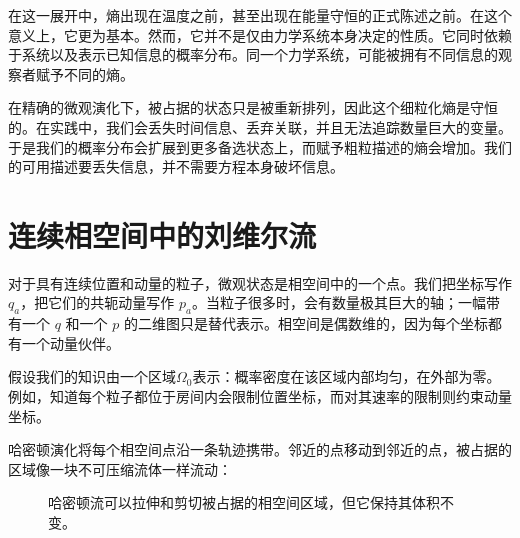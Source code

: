 在这一展开中，熵出现在温度之前，甚至出现在能量守恒的正式陈述之前。在这个意义上，它更为基本。然而，它并不是仅由力学系统本身决定的性质。它同时依赖于系统以及表示已知信息的概率分布。同一个力学系统，可能被拥有不同信息的观察者赋予不同的熵。

在精确的微观演化下，被占据的状态只是被重新排列，因此这个细粒化熵是守恒的。在实践中，我们会丢失时间信息、丢弃关联，并且无法追踪数量巨大的变量。于是我们的概率分布会扩展到更多备选状态上，而赋予粗粒描述的熵会增加。我们的可用描述要丢失信息，并不需要方程本身破坏信息。

\begin{classroomqa}
\end{classroomqa}

\section{连续相空间中的刘维尔流}

对于具有连续位置和动量的粒子，微观状态是相空间中的一个点。我们把坐标写作 \(q_a\)，把它们的共轭动量写作 \(p_a\)。当粒子很多时，会有数量极其巨大的轴；一幅带有一个 \(q\) 和一个 \(p\) 的二维图只是替代表示。相空间是偶数维的，因为每个坐标都有一个动量伙伴。

假设我们的知识由一个区域\(\Omega_0\)表示：概率密度在该区域内部均匀，在外部为零。例如，知道每个粒子都位于房间内会限制位置坐标，而对其速率的限制则约束动量坐标。

哈密顿演化将每个相空间点沿一条轨迹携带。邻近的点移动到邻近的点，被占据的区域像一块不可压缩流体一样流动：
\begin{figure}[htbp]
\centering
{}
\caption{哈密顿流可以拉伸和剪切被占据的相空间区域，但它保持其体积不变。}
\label{fig:sm1-liouville-flow}
\end{figure}

